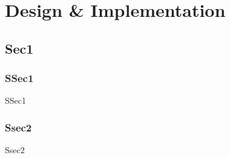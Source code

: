 
\chapter{Design \& Implementation}
\label{cha:design_implementation}

\section{Sec1}
  \subsection{SSec1}
    SSec1

  \subsection{Ssec2}
    \label{ssec:3.2}
    Ssec2
